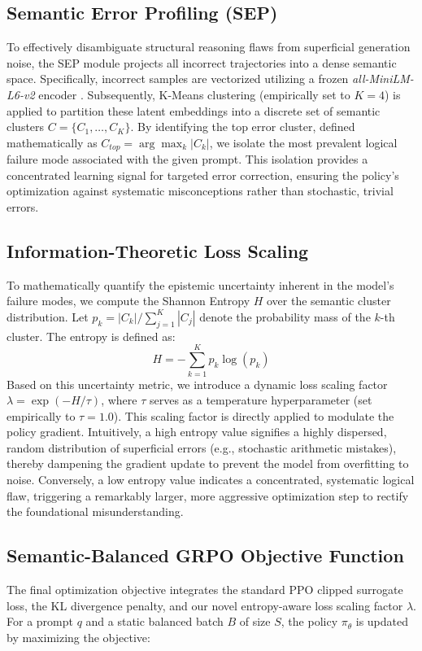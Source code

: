 \subsection{Semantic Error Profiling (SEP)}\label{subsec:SEP}
To effectively disambiguate structural reasoning flaws from superficial generation noise, the SEP module projects all incorrect trajectories into a dense semantic space. Specifically, incorrect samples are vectorized utilizing a frozen \textit{all-MiniLM-L6-v2} encoder \cite{reimers2019sentencebertsentenceembeddingsusing}. Subsequently, K-Means clustering \cite{article} (empirically set to $K=4$) is applied to partition these latent embeddings into a discrete set of semantic clusters $C = \{C_1, \dots, C_K\}$. By identifying the top error cluster, defined mathematically as $C_{top} = \arg\max_k |C_k|$, we isolate the most prevalent logical failure mode associated with the given prompt. This isolation provides a concentrated learning signal for targeted error correction, ensuring the policy's optimization against systematic misconceptions rather than stochastic, trivial errors.
\subsection{Information-Theoretic Loss Scaling}\label{subsec:info-theoretic-loss}
To mathematically quantify the epistemic uncertainty inherent in the model's failure modes, we compute the Shannon Entropy $H$ over the semantic cluster distribution. Let $p_k = |C_k| / \sum_{j=1}^K |C_j|$ denote the probability mass of the $k$-th cluster. The entropy is defined as:
\begin{equation}
H = - \sum_{k=1}^K p_k \log(p_k)
\end{equation}
Based on this uncertainty metric, we introduce a dynamic loss scaling factor $\lambda = \exp(-H/\tau)$, where $\tau$ serves as a temperature hyperparameter (set empirically to $\tau=1.0$). This scaling factor is directly applied to modulate the policy gradient. Intuitively, a high entropy value signifies a highly dispersed, random distribution of superficial errors (e.g., stochastic arithmetic mistakes), thereby dampening the gradient update to prevent the model from overfitting to noise. Conversely, a low entropy value indicates a concentrated, systematic logical flaw, triggering a remarkably larger, more aggressive optimization step to rectify the foundational misunderstanding.

\subsection{Semantic-Balanced GRPO Objective Function}
The final optimization objective integrates the standard PPO clipped surrogate loss, the KL divergence penalty, and our novel entropy-aware loss scaling factor $\lambda$. For a prompt $q$ and a static balanced batch $B$ of size $S$, the policy $\pi_\theta$ is updated by maximizing the objective:

